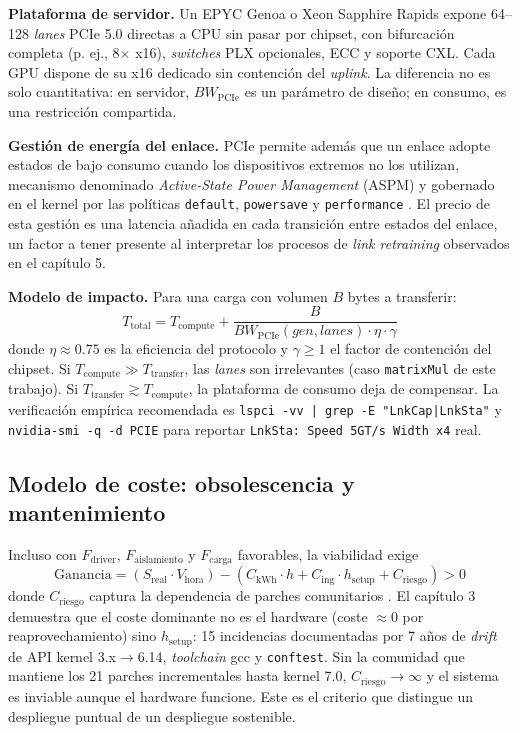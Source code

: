 \textbf{Plataforma de servidor.} Un EPYC Genoa o Xeon Sapphire Rapids expone 64--128 \textit{lanes} PCIe 5.0 directas a CPU sin pasar por chipset, con bifurcación completa (p. ej., 8$\times$ x16), \textit{switches} PLX opcionales, ECC y soporte CXL. Cada GPU dispone de su x16 dedicado sin contención del \textit{uplink}. La diferencia no es solo cuantitativa: en servidor, $BW_{\text{PCIe}}$ es un parámetro de diseño; en consumo, es una restricción compartida.

\textbf{Gestión de energía del enlace.} PCIe permite además que un enlace adopte estados de bajo consumo cuando los dispositivos extremos no los utilizan, mecanismo denominado \textit{Active-State Power Management} (ASPM) y gobernado en el kernel por las políticas \texttt{default}, \texttt{powersave} y \texttt{performance} \cite{redhat_aspm,kernel_pci_pm}. El precio de esta gestión es una latencia añadida en cada transición entre estados del enlace, un factor a tener presente al interpretar los procesos de \textit{link retraining} observados en el capítulo 5.

\textbf{Modelo de impacto.} Para una carga con volumen $B$ bytes a transferir:
\begin{equation}
T_{\text{total}} = T_{\text{compute}} + \frac{B}{BW_{\text{PCIe}}(gen, lanes) \cdot \eta \cdot \gamma}
\end{equation}
donde $\eta \approx 0.75$ es la eficiencia del protocolo y $\gamma \geq 1$ el factor de contención del chipset. Si $T_{\text{compute}} \gg T_{\text{transfer}}$, las \textit{lanes} son irrelevantes (caso \texttt{matrixMul} de este trabajo). Si $T_{\text{transfer}} \gtrsim T_{\text{compute}}$, la plataforma de consumo deja de compensar. La verificación empírica recomendada es \texttt{lspci -vv | grep -E "LnkCap|LnkSta"} y \texttt{nvidia-smi -q -d PCIE} para reportar \texttt{LnkSta: Speed 5GT/s Width x4} real.

\subsection{Modelo de coste: obsolescencia y mantenimiento}

Incluso con $F_{\text{driver}}$, $F_{\text{aislamiento}}$ y $F_{\text{carga}}$ favorables, la viabilidad exige
\begin{equation}
\text{Ganancia} = (S_{\text{real}} \cdot V_{\text{hora}}) - (C_{\text{kWh}} \cdot h + C_{\text{ing}} \cdot h_{\text{setup}} + C_{\text{riesgo}}) > 0
\end{equation}
donde $C_{\text{riesgo}}$ captura la dependencia de parches comunitarios \cite{michelboucey,dkosmari,dkms}. El capítulo 3 demuestra que el coste dominante no es el hardware (coste $\approx$0 por reaprovechamiento) sino $h_{\text{setup}}$: 15 incidencias documentadas por 7 años de \textit{drift} de API kernel 3.x$\rightarrow$6.14, \textit{toolchain} gcc y \texttt{conftest}. Sin la comunidad que mantiene los 21 parches incrementales hasta kernel 7.0, $C_{\text{riesgo}} \to \infty$ y el sistema es inviable aunque el hardware funcione. Este es el criterio que distingue un despliegue puntual de un despliegue sostenible.

